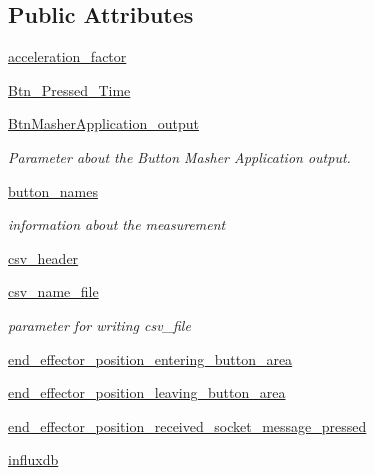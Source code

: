 \subsection*{Public Attributes}
\begin{DoxyCompactItemize}
\item 
\hyperlink{classRET__Parameter_1_1RET__Parameter_abd224cfc80b136898df89af7812fa8d5}{acceleration\+\_\+factor}
\item 
\hyperlink{classRET__Parameter_1_1RET__Parameter_a39e93ce131ad25f98c5ce27c3ab36a6e}{Btn\+\_\+\+Pressed\+\_\+\+Time}
\item 
\hyperlink{classRET__Parameter_1_1RET__Parameter_a2b7700878675832931a1182c86c13de3}{Btn\+Masher\+Application\+\_\+output}
\begin{DoxyCompactList}\small\item\em Parameter about the Button Masher Application output. \end{DoxyCompactList}\item 
\hyperlink{classRET__Parameter_1_1RET__Parameter_a62209bbfef695c79e2e4a3c58cde6904}{button\+\_\+names}
\begin{DoxyCompactList}\small\item\em information about the measurement \end{DoxyCompactList}\item 
\hyperlink{classRET__Parameter_1_1RET__Parameter_a6a998519b5c6ea893e0afee65eccbf93}{csv\+\_\+header}
\item 
\hyperlink{classRET__Parameter_1_1RET__Parameter_a195beb1936a2c54c9c5b84ee44779c23}{csv\+\_\+name\+\_\+file}
\begin{DoxyCompactList}\small\item\em parameter for writing csv\+\_\+file \end{DoxyCompactList}\item 
\hyperlink{classRET__Parameter_1_1RET__Parameter_ac1a9a183848e43cc95622a427a79fffe}{end\+\_\+effector\+\_\+position\+\_\+entering\+\_\+button\+\_\+area}
\item 
\hyperlink{classRET__Parameter_1_1RET__Parameter_a9c8c6317198ca7fcf65796f882f5c428}{end\+\_\+effector\+\_\+position\+\_\+leaving\+\_\+button\+\_\+area}
\item 
\hyperlink{classRET__Parameter_1_1RET__Parameter_a1e5d03d6109af678189c173702b43d8a}{end\+\_\+effector\+\_\+position\+\_\+received\+\_\+socket\+\_\+message\+\_\+pressed}
\item 
\hyperlink{classRET__Parameter_1_1RET__Parameter_a034f595b48aad7217bd228d3620eaca8}{influxdb}

\end{DoxyCompactItemize}
